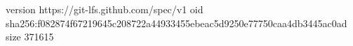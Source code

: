 version https://git-lfs.github.com/spec/v1
oid sha256:f082874f67219645c208722a44933455ebeac5d9250e77750caa4db3445ac0ad
size 371615
